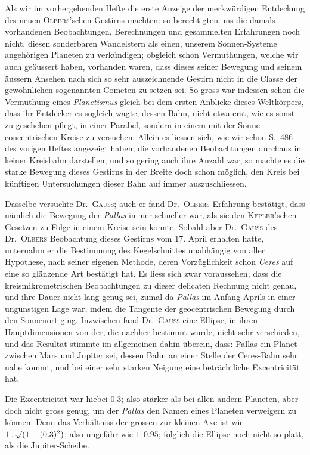 Als wir im vorhergehenden Hefte die erste Anzeige der merkwürdigen Entdeckung des neuen \textsc{Olbers}'schen Gestirns machten: so berechtigten uns die damals vorhandenen Beobachtungen, Berechnungen und gesammelten Erfahrungen noch nicht, diesen sonderbaren Wandelstern als einen, unserem Sonnen-Systeme angehörigen Planeten zu verkündigen; obgleich schon Vermuthungen, welche wir auch geäussert haben, vorhanden waren, dass dieses seiner Bewegung und seinem äussern Ansehen nach sich so sehr auszeichnende Gestirn nicht in die Classe der gewöhnlichen sogenannten Cometen zu setzen sei. So gross war indessen schon die Vermuthung eines \textit{Planetismus} gleich bei dem ersten Anblicke dieses Weltkörpers, dass ihr Entdecker es sogleich wagte, dessen Bahn, nicht etwa erst, wie es sonst zu geschehen pflegt, in einer Parabel, sondern in einem mit der Sonne concentrischen Kreise zu versuchen. Allein es liessen sich, wie wir schon S.\ 486 des vorigen Heftes angezeigt haben, die vorhandenen Beobachtungen durchaus in keiner Kreisbahn darstellen, und so gering auch ihre Anzahl war, so machte es die starke Bewegung dieses Gestirns in der Breite doch schon möglich, den Kreis bei künftigen Untersuchungen dieser Bahn auf immer auszuschliessen.

Dasselbe versuchte Dr.\ \textsc{Gauss}; auch er fand Dr.\ \textsc{Olbers} Erfahrung bestätigt, dass nämlich die Bewegung der \textit{Pallas} immer schneller war, als sie den \textsc{Kepler}'schen Gesetzen zu Folge in einem Kreise sein konnte. Sobald aber Dr.\ \textsc{Gauss} des Dr.\ \textsc{Olbers} Beobachtung dieses Gestirns vom 17. April erhalten hatte, unternahm er die Bestimmung des Kegelschnittes unabhängig von aller Hypothese, nach seiner eigenen Methode, deren Vorzüglichkeit schon \textit{Ceres} auf eine so glänzende Art bestätigt hat. Es liess sich zwar voraussehen, dass die kreismikrometrischen Beobachtungen zu dieser delicaten Rechnung nicht genau, und ihre Dauer nicht lang genug sei, zumal da \textit{Pallas} im Anfang Aprils in einer ungünstigen Lage war, indem die Tangente der geocentrischen Bewegung durch den Sonnenort ging. Inzwischen fand Dr.\ \textsc{Gauss} eine Ellipse, in ihren Hauptdimensionen von der, die nachher bestimmt wurde, nicht sehr verschieden, und das Resultat stimmte im allgemeinen dahin überein, dass: Pallas ein Planet zwischen Mars und Jupiter sei, dessen Bahn an einer Stelle der Ceres-Bahn sehr nahe kommt, und bei einer sehr starken Neigung eine beträchtliche Excentricität hat.

Die Excentricität war hiebei $0.3$; also stärker als bei allen andern Planeten, aber doch nicht gross genug, um der \textit{Pallas} den Namen eines Planeten verweigern zu können. Denn das Verhältniss der grossen zur kleinen Axe ist wie $1:\mathord{{}^{}\!\surd}(1-(0.3)^2)$; also ungefähr wie $1:0.95$; folglich die Ellipse noch nicht so platt, als die Jupiter-Scheibe.

